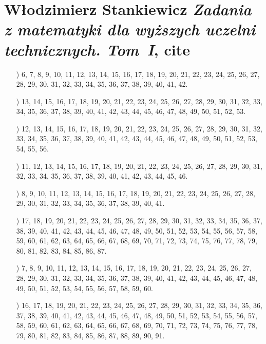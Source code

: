 \documentclass[a4paper,11pt]{article}
\numberwithin{equation}{section}
\begin{document}
\section{Włodzimierz Stankiewicz \textit{Zadania z matematyki
    dla wyższych uczelni technicznych. Tom~I}, cite{}}

\label{sec:Oznaczenia-i-konwencje}


\begin{itemize}

\item[\romannumeral1)] 6, 7, 8, 9, 10, 11, 12, 13, 14, 15, 16, 17, 18, 19,
  20, 21, 22, 23, 24, 25, 26, 27, 28, 29, 30, 31, 32, 33, 34, 35, 36, 37,
  38, 39, 40, 41, 42.

\item[\romannumeral2)] 13, 14, 15, 16, 17, 18, 19, 20, 21, 22, 23, 24, 25,
  26, 27, 28, 29, 30, 31, 32, 33, 34, 35, 36, 37, 38, 39, 40, 41, 42, 43,
  44, 45, 46, 47, 48, 49, 50, 51, 52, 53.

\item[\romannumeral3)] 12, 13, 14, 15, 16, 17, 18, 19, 20, 21, 22, 23, 24,
  25, 26, 27, 28, 29, 30, 31, 32, 33, 34, 35, 36, 37, 38, 39, 40, 41, 42,
  43, 44, 45, 46, 47, 48, 49, 50, 51, 52, 53, 54, 55, 56.

\item[\romannumeral4)] 11, 12, 13, 14, 15, 16, 17, 18, 19, 20, 21, 22, 23,
  24, 25, 26, 27, 28, 29, 30, 31, 32, 33, 34, 35, 36, 37, 38, 39, 40, 41,
  42, 43, 44, 45, 46.

\item[\romannumeral5)] 8, 9, 10, 11, 12, 13, 14, 15, 16, 17, 18, 19, 20, 21,
  22, 23, 24, 25, 26, 27, 28, 29, 30, 31, 32, 33, 34, 35, 36, 37, 38, 39,
  40, 41.

\item[\romannumeral6)] 17, 18, 19, 20, 21, 22, 23, 24, 25, 26, 27, 28, 29,
  30, 31, 32, 33, 34, 35, 36, 37, 38, 39, 40, 41, 42, 43, 44, 45, 46, 47,
  48, 49, 50, 51, 52, 53, 54, 55, 56, 57, 58, 59, 60, 61, 62, 63, 64, 65,
  66, 67, 68, 69, 70, 71, 72, 73, 74, 75, 76, 77, 78, 79, 80, 81, 82, 83,
  84, 85, 86, 87.

\item[\romannumeral7)] 7, 8, 9, 10, 11, 12, 13, 14, 15, 16, 17, 18, 19, 20,
  21, 22, 23, 24, 25, 26, 27, 28, 29, 30, 31, 32, 33, 34, 35, 36, 37, 38,
  39, 40, 41, 42, 43, 44, 45, 46, 47, 48, 49, 50, 51, 52, 53, 54, 55, 56,
  57, 58, 59, 60.

\item[\romannumeral8)] 16, 17, 18, 19, 20, 21, 22, 23, 24, 25, 26, 27, 28,
  29, 30, 31, 32, 33, 34, 35, 36, 37, 38, 39, 40, 41, 42, 43, 44, 45, 46,
  47, 48, 49, 50, 51, 52, 53, 54, 55, 56, 57, 58, 59, 60, 61, 62, 63, 64,
  65, 66, 67, 68, 69, 70, 71, 72, 73, 74, 75, 76, 77, 78, 79, 80, 81, 82,
  83, 84, 85, 86, 87, 88, 89, 90, 91.


\end{itemize}
\end{document}
